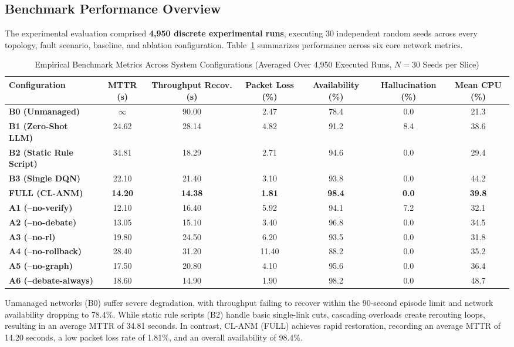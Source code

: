 \documentclass[10pt,twocolumn,a4paper]{article}
\begin{document}
\subsection{Benchmark Performance Overview}
The experimental evaluation comprised \textbf{4,950 discrete experimental runs}, executing 30 independent random seeds across every topology, fault scenario, baseline, and ablation configuration. Table~\ref{tab:benchmarks} summarizes performance across six core network metrics.

\begin{table}[!t]
\centering
\caption{Empirical Benchmark Metrics Across System Configurations (Averaged Over 4,950 Executed Runs, $N=30$ Seeds per Slice)}
\label{tab:benchmarks}
\begin{tabular*}{\textwidth}{@{\extracolsep{\fill}}lcccccc@{}}
\toprule
\textbf{Configuration} & \textbf{MTTR (s)} & \textbf{Throughput Recov. (s)} & \textbf{Packet Loss (\%)} & \textbf{Availability (\%)} & \textbf{Hallucination (\%)} & \textbf{Mean CPU (\%)} \\
\midrule
\textbf{B0 (Unmanaged)} & $\infty$ & 90.00 & 2.47 & 78.4 & 0.0 & 21.3 \\
\textbf{B1 (Zero-Shot LLM)} & 24.62 & 28.14 & 4.82 & 91.2 & 8.4 & 38.6 \\
\textbf{B2 (Static Rule Script)} & 34.81 & 18.29 & 2.71 & 94.6 & 0.0 & 29.4 \\
\textbf{B3 (Single DQN)} & 22.10 & 21.40 & 3.10 & 93.8 & 0.0 & 44.2 \\
\midrule
\textbf{FULL (CL-ANM)} & \textbf{14.20} & \textbf{14.38} & \textbf{1.81} & \textbf{98.4} & \textbf{0.0} & \textbf{39.8} \\
\midrule
\textbf{A1 (--no-verify)} & 12.10 & 16.40 & 5.92 & 94.1 & 7.2 & 32.1 \\
\textbf{A2 (--no-debate)} & 13.05 & 15.10 & 3.40 & 96.8 & 0.0 & 34.5 \\
\textbf{A3 (--no-rl)} & 19.80 & 24.50 & 6.20 & 93.5 & 0.0 & 31.8 \\
\textbf{A4 (--no-rollback)} & 28.40 & 31.20 & 11.40 & 88.2 & 0.0 & 35.2 \\
\textbf{A5 (--no-graph)} & 17.50 & 20.80 & 4.10 & 95.6 & 0.0 & 36.4 \\
\textbf{A6 (--debate-always)} & 18.60 & 14.90 & 1.90 & 98.2 & 0.0 & 48.7 \\
\bottomrule
\end{tabular*}
\end{table}

Unmanaged networks (B0) suffer severe degradation, with throughput failing to recover within the 90-second episode limit and network availability dropping to 78.4\%. While static rule scripts (B2) handle basic single-link cuts, cascading overloads create rerouting loops, resulting in an average MTTR of 34.81 seconds. In contrast, CL-ANM (FULL) achieves rapid restoration, recording an average MTTR of 14.20 seconds, a low packet loss rate of 1.81\%, and an overall availability of 98.4\%.
\end{document}
